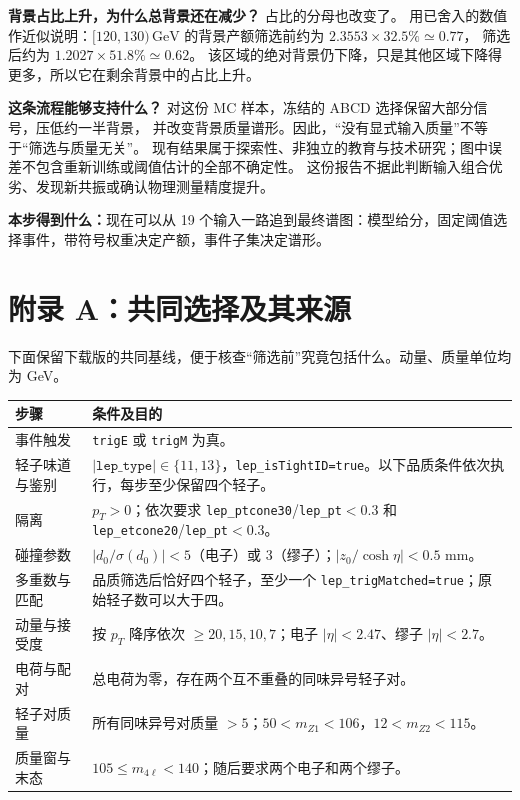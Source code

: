 \documentclass[11pt,a4paper,fontset=fandol,scheme=plain]{ctexart}
\newcommand{\reportsection}[1]{\section*{\textcolor{reportblue}{#1}}}
\newcommand{\gev}{\,\mathrm{GeV}}
\newcommand{\takeaway}[1]{\par\medskip\noindent\colorbox{reportblue!7}{\parbox{\dimexpr\linewidth-2\fboxsep\relax}{\textbf{本步得到什么：}#1}}\par}
\begin{document}
\textbf{背景占比上升，为什么总背景还在减少？} 占比的分母也改变了。
用已舍入的数值作近似说明：$[120,130)\gev$ 的背景产额筛选前约为 $2.3553\times32.5\%\simeq0.77$，
筛选后约为 $1.2027\times51.8\%\simeq0.62$。
该区域的绝对背景仍下降，只是其他区域下降得更多，所以它在剩余背景中的占比上升。

\textbf{这条流程能够支持什么？} 对这份 MC 样本，冻结的 ABCD 选择保留大部分信号，压低约一半背景，
并改变背景质量谱形。因此，“没有显式输入质量”不等于“筛选与质量无关”。
现有结果属于探索性、非独立的教育与技术研究；图中误差不包含重新训练或阈值估计的全部不确定性。
这份报告不据此判断输入组合优劣、发现新共振或确认物理测量精度提升。
\takeaway{现在可以从 19 个输入一路追到最终谱图：模型给分，固定阈值选择事件，带符号权重决定产额，事件子集决定谱形。}

\clearpage
\reportsection{附录 A：共同选择及其来源}
下面保留下载版的共同基线，便于核查“筛选前”究竟包括什么。动量、质量单位均为 GeV。
\begin{table}[H]
\small
\renewcommand{\arraystretch}{1.18}
\begin{tabularx}{\linewidth}{@{}p{.22\linewidth}Y@{}}
\toprule
步骤 & 条件及目的\\
\midrule
事件触发 & \texttt{trigE} 或 \texttt{trigM} 为真。\\
轻子味道与鉴别 & $|\texttt{lep\_type}|\in\{11,13\}$，\texttt{lep\_isTightID=true}。以下品质条件依次执行，每步至少保留四个轻子。\\
隔离 & $p_T>0$；依次要求 \texttt{lep\_ptcone30}/\texttt{lep\_pt}$<0.3$ 和 \texttt{lep\_etcone20}/\texttt{lep\_pt}$<0.3$。\\
碰撞参数 & $|d_0/\sigma(d_0)|<5$（电子）或 3（缪子）；$|z_0/\cosh\eta|<0.5$ mm。\\
多重数与匹配 & 品质筛选后恰好四个轻子，至少一个 \texttt{lep\_trigMatched=true}；原始轻子数可以大于四。\\
动量与接受度 & 按 $p_T$ 降序依次 $\geq20,15,10,7$；电子 $|\eta|<2.47$、缪子 $|\eta|<2.7$。\\
电荷与配对 & 总电荷为零，存在两个互不重叠的同味异号轻子对。\\
轻子对质量 & 所有同味异号对质量 $>5$；$50<m_{Z1}<106$，$12<m_{Z2}<115$。\\
质量窗与末态 & $105\leq m_{4\ell}<140$；随后要求两个电子和两个缪子。\\
\bottomrule
\end{tabularx}
\end{table}
\end{document}
